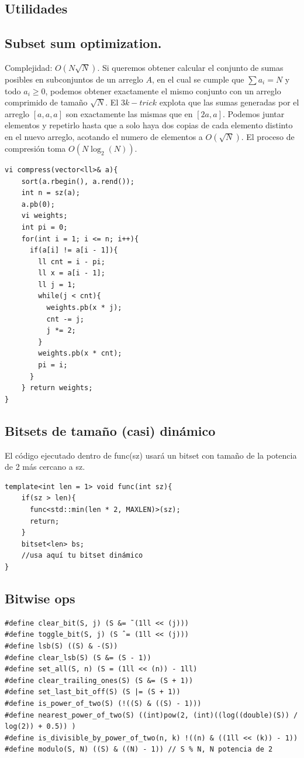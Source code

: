 \documentclass[10pt,spanish,mexico]{article}
\numberwithin{equation}{section}
\begin{document}
\begin{multicols}{2}
\vspace{-1.2\baselineskip}
\hrulefill
\section{Utilidades}
\subsection{Subset sum optimization.}
Complejidad: $O(N\sqrt{N})$. Si queremos obtener calcular el conjunto de sumas posibles en subconjuntos de un arreglo $A$, en el cual se cumple que $\sum a_i = N$ y todo $a_i\geq0$, podemos obtener exactamente el mismo conjunto con un arreglo comprimido de tamaño $\sqrt{N}$. El $3k-trick$ explota que las sumas generadas por el arreglo $[a,a,a]$ son exactamente las mismas que en $[2a,a]$. Podemos juntar elementos y repetirlo hasta que a solo haya dos copias de cada elemento distinto en el nuevo arreglo, acotando el numero de elementos a $O(\sqrt{N})$. El proceso de compresión toma $O(N\log_2(N))$.
\begin{verbatim}
vi compress(vector<ll>& a){
    sort(a.rbegin(), a.rend());
    int n = sz(a);
    a.pb(0);
    vi weights;
    int pi = 0;
    for(int i = 1; i <= n; i++){
      if(a[i] != a[i - 1]){
        ll cnt = i - pi;
        ll x = a[i - 1];
        ll j = 1;
        while(j < cnt){
          weights.pb(x * j);
          cnt -= j;
          j *= 2;
        }
        weights.pb(x * cnt);
        pi = i;
      }
    } return weights;
}
\end{verbatim}

\vspace{-1.2\baselineskip}
\hrulefill
\subsection{Bitsets de tamaño (casi) dinámico}
El código ejecutado dentro de func(sz) usará un bitset con tamaño de la potencia de 2 más cercano a sz.
\begin{verbatim}
template<int len = 1> void func(int sz){
    if(sz > len){
      func<std::min(len * 2, MAXLEN)>(sz);
      return;
    }
    bitset<len> bs;
    //usa aquí tu bitset dinámico
}
\end{verbatim}

\vspace{-1.2\baselineskip}
\hrulefill
\subsection{Bitwise ops}
\begin{verbatim}
#define clear_bit(S, j) (S &= ˜(1ll << (j)))
#define toggle_bit(S, j) (S ˆ= (1ll << (j)))
#define lsb(S) ((S) & -(S))
#define clear_lsb(S) (S &= (S - 1))
#define set_all(S, n) (S = (1ll << (n)) - 1ll)
#define clear_trailing_ones(S) (S &= (S + 1))
#define set_last_bit_off(S) (S |= (S + 1))
#define is_power_of_two(S) (!((S) & ((S) - 1)))
#define nearest_power_of_two(S) ((int)pow(2, (int)((log((double)(S)) / log(2)) + 0.5)) )
#define is_divisible_by_power_of_two(n, k) !((n) & ((1ll << (k)) - 1))
#define modulo(S, N) ((S) & ((N) - 1)) // S % N, N potencia de 2
\end{verbatim}


\end{multicols}
\end{document}
